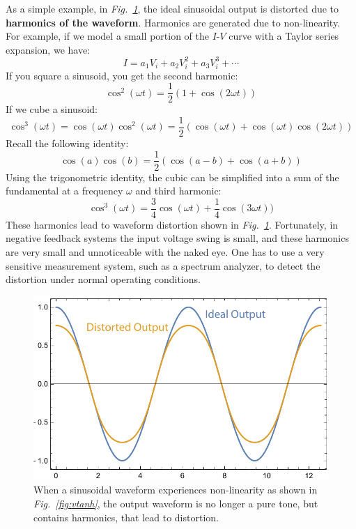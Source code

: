 As a simple example, in \emph{Fig.~\ref{fig:vdisto}}, the ideal sinusoidal output is distorted due to \textbf{harmonics of the waveform}.  Harmonics are generated due to non-linearity.  For example, if we model a small portion of the $I$-$V$ curve with a Taylor series expansion, we have:
    \begin{equation}
        I = a_1 V_i + a_2 V_i^2 + a_3 V_i^3 + \cdots
    \end{equation}
If you square a sinusoid, you get the second harmonic:
    \begin{equation}
        \cos^2(\omega t) = \frac{1}{2} \left(1 + \cos(2 \omega t) \right)
    \end{equation}
If we cube a sinusoid:
    \begin{equation}
        \cos^3(\omega t) = \cos(\omega t) \cos^2(\omega t) = \frac{1}{2} \left(\cos(\omega t) + \cos(\omega t)\cos(2 \omega t) \right)
    \end{equation}
Recall the following identity:
    \begin{equation}
        \cos(a) \cos(b) = \frac{1}{2} \left( \cos(a - b) + \cos(a + b) \right) 
    \end{equation}
Using the trigonometric identity, the cubic can be simplified into a sum of the fundamental at a frequency $\omega$ and third harmonic:
    \begin{equation}
        \cos^3(\omega t) =  \frac{3}{4} \cos(\omega t) + \frac{1}{4} \cos(3 \omega t)) 	
    \end{equation}
These harmonics lead to waveform distortion shown in \emph{Fig.~\ref{fig:vdisto}}.  Fortunately, in negative feedback systems the input voltage swing is small, and these harmonics are very small and unnoticeable with the naked eye.  One has to use a very sensitive measurement system, such as a spectrum analyzer, to detect the distortion under normal operating conditions.
\begin{figure}[H]
\centering
\includegraphics[width=.75\columnwidth]{vdisto}
\caption{When a sinusoidal waveform experiences non-linearity as shown in \emph{Fig.~\ref{fig:vtanh}}, the output waveform is no longer a pure tone, but contains harmonics, that lead to distortion.}
\label{fig:vdisto}
\end{figure}
